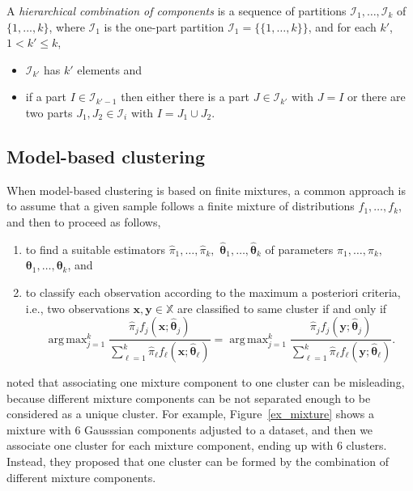 \documentclass[10pt, a4paper]{article}
\DeclareMathOperator*{\argmax}{arg\,max}
\newcommand{\m}[1]{\boldsymbol{#1}}
\begin{document}
A \emph{hierarchical combination of components} is a sequence of partitions $\mathcal{I}_1, \dots, \mathcal{I}_k$ of $\{1,...,k\}$, where $\mathcal{I}_1$ is the one-part partition $\mathcal{I}_1 = \{ \{1, \dots, k\} \}$, and for each $k'$, $1 <  k' \leq k$,
\begin{itemize}
\item $\mathcal{I}_{k'}$ has $k'$ elements  and
\item if a part $I \in \mathcal{I}_{k'-1}$ then either there is a part $J \in \mathcal{I}_{k'}$ with $J = I$ or there are two parts $J_1, J_2 \in \mathcal{I}_i$ with $I = J_1 \cup J_2$.
\end{itemize}


\subsection*{Model-based clustering}

When model-based clustering is based on finite mixtures, a common approach is to assume that a given sample follows a finite mixture of distributions $f_1, \dots, f_k$, and then to proceed as follows, 
\begin{enumerate}
\item to find a suitable estimators $\hat{\pi}_1, \dots, \hat{\pi}_k,$ $\hat{\m\theta}_1, \dots, \hat{\m\theta}_k$ of parameters $\pi_1, \dots, \pi_k,$ $\m\theta_1, \dots, \m\theta_k$, and
\item to classify each observation according to the maximum a posteriori criteria, i.e., two observations $\m x, \m y \in \mathbb{X}$ are classified to same cluster if and only if
\[
\argmax_{j=1}^k \frac{ \hat{\pi}_j f_j(\m x ; \hat{\m\theta}_j) }{\sum_{\ell=1}^k \hat{\pi}_\ell f_\ell(\m x ; \hat{\m\theta}_\ell) } = \argmax_{j=1}^k \frac{ \hat{\pi}_j f_j(\m y ; \hat{\m\theta}_j) }{ \sum_{\ell=1}^k \hat{\pi}_\ell f_\ell(\m y ; \hat{\m\theta}_\ell) }.
\]
\end{enumerate}


\cite{lee2004combining,hennig2010methods,baudry2010combining,melnykov2013distribution,pastore2013merging} noted that associating one mixture component to one cluster can be misleading, because different mixture components can be not separated enough to be considered as a unique cluster. For example, Figure~\ref{ex_mixture} shows  a mixture with 6 Gausssian components adjusted to a dataset, and then we associate one cluster for each mixture component, ending up with 6 clusters. Instead, they proposed that one cluster can be formed by the combination of different mixture components. 
\end{document}
